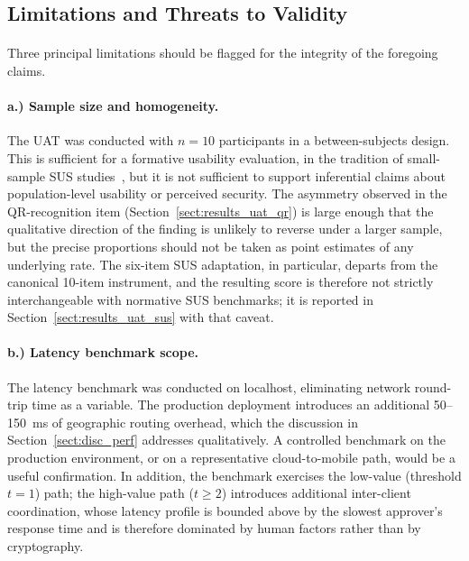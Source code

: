 \subsection{Limitations and Threats to Validity}
\label{sect:disc_limits}

\paragraph{}Three principal limitations should be flagged for the integrity of the foregoing claims.

\paragraph{a.) Sample size and homogeneity.}
The UAT was conducted with $n = 10$ participants in a between-subjects design. This is sufficient for a formative usability evaluation, in the tradition of small-sample SUS studies~\cite{brooke1996sus, bangor2008sus}, but it is not sufficient to support inferential claims about population-level usability or perceived security. The asymmetry observed in the QR-recognition item (Section~\ref{sect:results_uat_qr}) is large enough that the qualitative direction of the finding is unlikely to reverse under a larger sample, but the precise proportions should not be taken as point estimates of any underlying rate. The six-item SUS adaptation, in particular, departs from the canonical 10-item instrument, and the resulting score is therefore not strictly interchangeable with normative SUS benchmarks; it is reported in Section~\ref{sect:results_uat_sus} with that caveat.

\paragraph{b.) Latency benchmark scope.}
The latency benchmark was conducted on localhost, eliminating network round-trip time as a variable. The production deployment introduces an additional 50--150~ms of geographic routing overhead, which the discussion in Section~\ref{sect:disc_perf} addresses qualitatively. A controlled benchmark on the production environment, or on a representative cloud-to-mobile path, would be a useful confirmation. In addition, the benchmark exercises the low-value (threshold $t = 1$) path; the high-value path ($t \geq 2$) introduces additional inter-client coordination, whose latency profile is bounded above by the slowest approver's response time and is therefore dominated by human factors rather than by cryptography.

